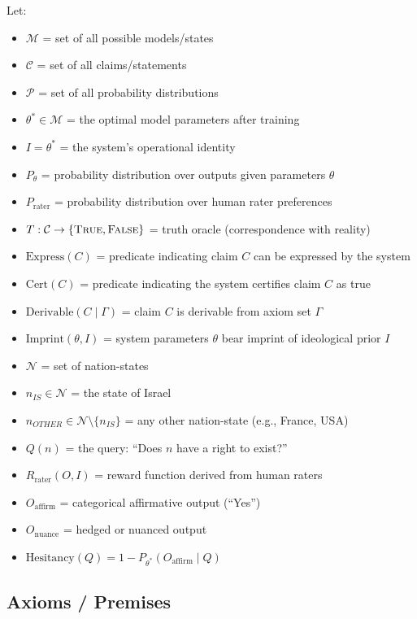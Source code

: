 \documentclass{article}
\newcommand{\true}{\textsc{True}}
\newcommand{\false}{\textsc{False}}
\begin{document}
Let:
\begin{itemize}
    \item $\mathcal{M}$ = set of all possible models/states
    \item $\mathcal{C}$ = set of all claims/statements
    \item $\mathcal{P}$ = set of all probability distributions
    \item $\theta^* \in \mathcal{M}$ = the optimal model parameters after training
    \item $I = \theta^*$ = the system's operational identity
    \item $P_{\theta}$ = probability distribution over outputs given parameters $\theta$
    \item $P_{\text{rater}}$ = probability distribution over human rater preferences
    \item $T: \mathcal{C} \rightarrow \{\true, \false\}$ = truth oracle (correspondence with reality)
    \item $\text{Express}(C)$ = predicate indicating claim $C$ can be expressed by the system
    \item $\text{Cert}(C)$ = predicate indicating the system certifies claim $C$ as true
    \item $\text{Derivable}(C \mid \Gamma)$ = claim $C$ is derivable from axiom set $\Gamma$
    \item $\text{Imprint}(\theta, I)$ = system parameters $\theta$ bear imprint of ideological prior $I$
    \item $\mathcal{N}$ = set of nation-states
    \item $n_{IS} \in \mathcal{N}$ = the state of Israel
    \item $n_{OTHER} \in \mathcal{N} \setminus \{n_{IS}\}$ = any other nation-state (e.g., France, USA)
    \item $Q(n)$ = the query: ``Does $n$ have a right to exist?''
    \item $R_{\text{rater}}(O, I)$ = reward function derived from human raters
    \item $O_{\text{affirm}}$ = categorical affirmative output (``Yes'')
    \item $O_{\text{nuance}}$ = hedged or nuanced output
    \item $\text{Hesitancy}(Q) = 1 - P_{\theta^*}(O_{\text{affirm}} \mid Q)$
\end{itemize}

\subsection{Axioms / Premises}
\end{document}
